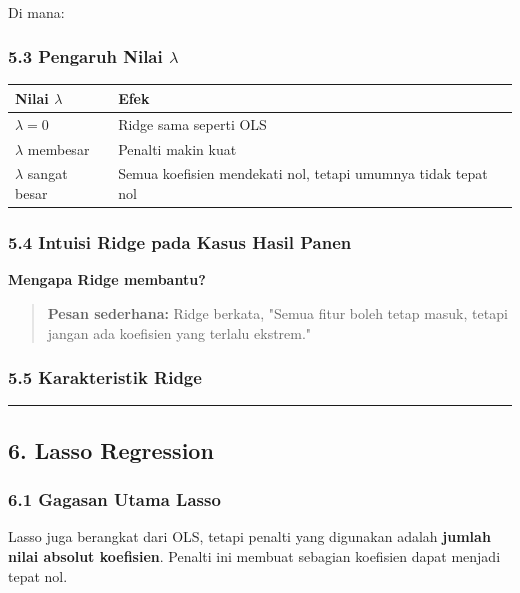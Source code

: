 \documentclass[12pt,a4paper]{article}
\begin{document}
\\[
\min_{\beta_0, \beta} \sum_{i=1}^{n} \left( y_i - \beta_0 - \sum_{j=1}^{p} x_{ij}\beta_j \right)^2 + \lambda \sum_{j=1}^{p} \beta_j^2
\\]


Di mana:


\subsubsection{5.3 Pengaruh Nilai $\lambda$}

\begin{tabular}{|l|l|}
\hline
Nilai $\lambda$ & Efek \\
\hline
$\lambda = 0$ & Ridge sama seperti OLS \\
\hline
$\lambda$ membesar & Penalti makin kuat \\
\hline
$\lambda$ sangat besar & Semua koefisien mendekati nol, tetapi umumnya tidak tepat nol \\
\hline
\end{tabular}


\subsubsection{5.4 Intuisi Ridge pada Kasus Hasil Panen}

\textbf{Mengapa Ridge membantu?}


\begin{quote}
\textbf{Pesan sederhana:} Ridge berkata, "Semua fitur boleh tetap masuk, tetapi jangan ada koefisien yang terlalu ekstrem."\end{quote}


\subsubsection{5.5 Karakteristik Ridge}


\hrule


\subsection{6. Lasso Regression}

\subsubsection{6.1 Gagasan Utama Lasso}

Lasso juga berangkat dari OLS, tetapi penalti yang digunakan adalah \textbf{jumlah nilai absolut koefisien}. Penalti ini membuat sebagian koefisien dapat menjadi tepat nol.
\end{document}
